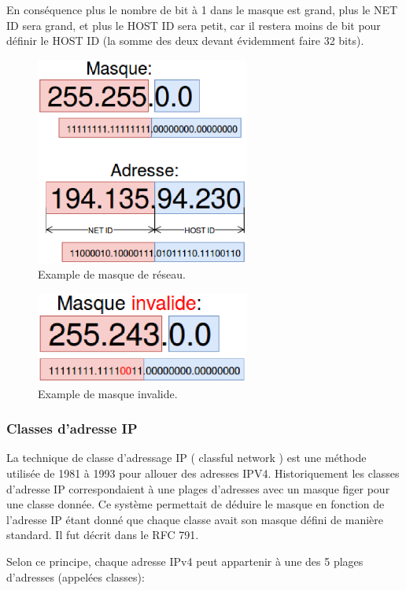 En conséquence plus le nombre de bit à 1 dans le masque est grand, plus le NET ID sera grand, et plus le HOST ID sera petit, car il restera moins de bit pour définir le HOST ID (la somme des deux devant évidemment faire 32 bits).

\begin{figure}[h]
\centering
\includegraphics[width=7cm]{./pics/maskipv4.eps}
\caption{Example de masque de réseau.}
\label{fig:exmask}
\end{figure}


\begin{figure}[h]
\centering
\includegraphics[width=7cm]{./pics/maskipv4inv.eps}
\caption{Example de masque invalide.}
\label{fig:exmaskin}
\end{figure}


\subsubsection{Classes d'adresse IP}
La technique de classe d'adressage IP ( classful network ) est une méthode
utilisée de 1981 à 1993 pour allouer des adresses IPV4.
Historiquement les classes d'adresse IP correspondaient à une plages d'adresses avec un masque figer pour une classe donnée.
Ce système permettait de déduire le masque en fonction
de l'adresse IP étant donné que chaque classe avait son masque défini de manière standard.
Il fut décrit dans le RFC 791\cite{url-RFC-791}.

Selon ce principe, chaque adresse IPv4 peut appartenir à une des 5 plages
d'adresses (appelées classes):

